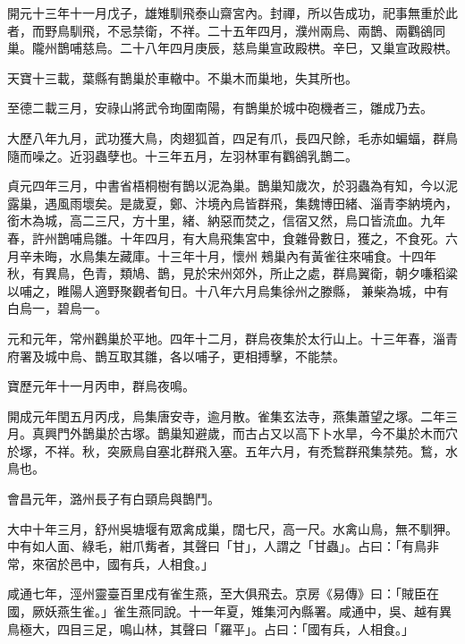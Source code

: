 \begin{pinyinscope}
 開元十三年十一月戊子，雄雉馴飛泰山齋宮內。封禪，所以告成功，祀事無重於此者，而野鳥馴飛，不忌禁衛，不祥。二十五年四月，濮州兩烏、兩鵲、兩鸜鵒同巢。隴州鵲哺慈烏。二十八年四月庚辰，慈烏巢宣政殿栱。辛巳，又巢宣政殿栱。



 天寶十三載，葉縣有鵲巢於車轍中。不巢木而巢地，失其所也。



 至德二載三月，安祿山將武令珣圍南陽，有鵲巢於城中砲機者三，雛成乃去。



 大歷八年九月，武功獲大鳥，肉翅狐首，四足有爪，長四尺餘，毛赤如蝙蝠，群鳥隨而噪之。近羽蟲孽也。十三年五月，左羽林軍有鸜鵒乳鵲二。



 貞元四年三月，中書省梧桐樹有鵲以泥為巢。鵲巢知歲次，於羽蟲為有知，今以泥露巢，遇風雨壞矣。是歲夏，鄭、汴境內烏皆群飛，集魏博田緒、淄青李納境內，銜木為城，高二三尺，方十里，緒、納惡而焚之，信宿又然，烏口皆流血。九年春，許州鵲哺烏雛。十年四月，有大鳥飛集宮中，食雜骨數日，獲之，不食死。六月辛未晦，水鳥集左藏庫。十三年十月，懷州鵊巢內有黃雀往來哺食。十四年秋，有異鳥，色青，類鳩、鵲，見於宋州郊外，所止之處，群鳥翼衛，朝夕嗛稻粱以哺之，睢陽人適野聚觀者旬日。十八年六月烏集徐州之滕縣，兼柴為城，中有白烏一，碧烏一。



 元和元年，常州鸛巢於平地。四年十二月，群烏夜集於太行山上。十三年春，淄青府署及城中烏、鵲互取其雛，各以哺子，更相搏擊，不能禁。



 寶歷元年十一月丙申，群烏夜鳴。



 開成元年閏五月丙戌，烏集唐安寺，逾月散。雀集玄法寺，燕集蕭望之塚。二年三月。真興門外鵲巢於古塚。鵲巢知避歲，而古占又以高下卜水旱，今不巢於木而穴於塚，不祥。秋，突厥鳥自塞北群飛入塞。五年六月，有禿鶖群飛集禁苑。鶖，水鳥也。



 會昌元年，潞州長子有白頸烏與鵲鬥。



 大中十年三月，舒州吳塘堰有眾禽成巢，闊七尺，高一尺。水禽山鳥，無不馴狎。中有如人面、綠毛，紺爪觜者，其聲曰「甘」，人謂之「甘蟲」。占曰：「有鳥非常，來宿於邑中，國有兵，人相食。」



 咸通七年，涇州靈臺百里戍有雀生燕，至大俱飛去。京房《易傳》曰：「賊臣在國，厥妖燕生雀。」雀生燕同說。十一年夏，雉集河內縣署。咸通中，吳、越有異鳥極大，四目三足，鳴山林，其聲曰「羅平」。占曰：「國有兵，人相食。」




\end{pinyinscope}
